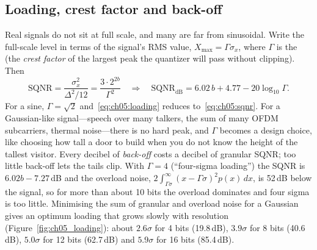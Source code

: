 
\subsection{Loading, crest factor and back-off}

Real signals do not sit at full scale, and many are far from sinusoidal. Write the full-scale
level in terms of the signal's RMS value, $X_{\max}=\Gamma\sigma_x$, where $\Gamma$ is the
 (the \emph{crest factor} of the largest peak the quantizer will pass
without clipping). Then
\begin{equation}
\text{SQNR}=\frac{\sigma_x^2}{\Delta^2/12}=\frac{3\cdot2^{2b}}{\Gamma^2}
\quad\Longrightarrow\quad
\text{SQNR}_{\text{dB}}=6.02\,b+4.77-20\log_{10}\Gamma.
\label{eq:ch05:loading}
\end{equation}
For a sine, $\Gamma=\sqrt2$ and~\eqref{eq:ch05:loading} reduces to~\eqref{eq:ch05:sqnr}. For a
Gaussian-like signal---speech over many talkers, the sum of many OFDM subcarriers, thermal
noise---there is no hard peak, and $\Gamma$ becomes a design choice, like choosing how tall a door
to build when you do not know the height of the tallest visitor. Every decibel of
\emph{back-off} costs a decibel of granular SQNR; too little back-off lets the tails clip.
With $\Gamma=4$ (``four-sigma loading'') the SQNR is $6.02b-7.27$\,dB and the overload noise,
$2\int_{\Gamma\sigma}^{\infty}(x-\Gamma\sigma)^2p(x)\,dx$, is 52\,dB below the signal, so for
more than about 10 bits the overload dominates and four sigma is too little. Minimising the
sum of granular and overload noise for a Gaussian gives an optimum loading that grows slowly
with resolution (Figure~\ref{fig:ch05_loading}): about $2.6\sigma$ for 4 bits (19.8\,dB), $3.9\sigma$
for 8 bits (40.6\,dB), $5.0\sigma$ for 12 bits (62.7\,dB) and $5.9\sigma$ for 16 bits (85.4\,dB).


